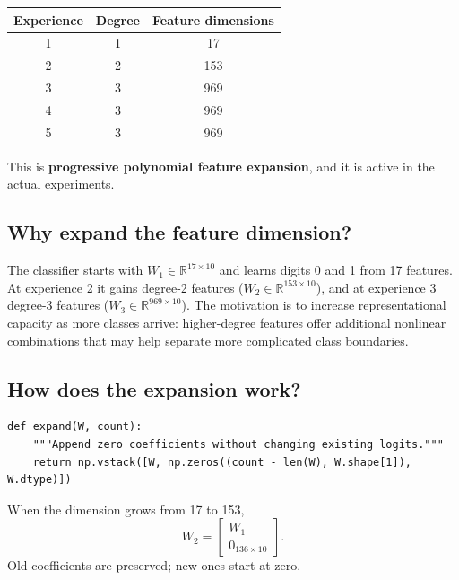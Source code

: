\documentclass[11pt,a4paper]{article}
\newcommand{\R}{\mathbb{R}}
\begin{document}
\begin{center}
\begin{tabular}{@{}ccc@{}}
\toprule
Experience & Degree & Feature dimensions\\
\midrule
1 & 1 & 17\\
2 & 2 & 153\\
3 & 3 & 969\\
4 & 3 & 969\\
5 & 3 & 969\\
\bottomrule
\end{tabular}
\end{center}

This is \textbf{progressive polynomial feature expansion}, and it is active in the actual experiments.

\subsection{Why expand the feature dimension?}

The classifier starts with $W_1\in\R^{17\times10}$ and learns digits 0 and 1 from 17 features. At experience 2 it gains degree-2 features ($W_2\in\R^{153\times10}$), and at experience 3 degree-3 features ($W_3\in\R^{969\times10}$). The motivation is to increase representational capacity as more classes arrive: higher-degree features offer additional nonlinear combinations that may help separate more complicated class boundaries.

\subsection{How does the expansion work?}

\begin{lstlisting}
def expand(W, count):
    """Append zero coefficients without changing existing logits."""
    return np.vstack([W, np.zeros((count - len(W), W.shape[1]), W.dtype)])
\end{lstlisting}
When the dimension grows from 17 to 153,
\[
W_2=\begin{bmatrix}W_1\\ 0_{136\times10}\end{bmatrix}.
\]
Old coefficients are preserved; new ones start at zero.
\end{document}
